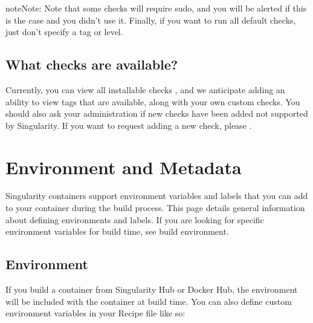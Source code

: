 \documentclass[letterpaper,10pt,english]{sphinxmanual}
\begin{document}
\begin{sphinxadmonition}{note}{Note:}
Note that some checks will require sudo, and you will be alerted if this
is the case and you didn’t use it. Finally, if you want to run all
default checks, just don’t specify a tag or level.
\end{sphinxadmonition}


\section{What checks are available?}
\label{\detokenize{container_checks:what-checks-are-available}}
Currently, you can view all installable checks
,
and we anticipate adding an ability to view tags that are available,
along with your own custom checks. You should also ask your
administration if new checks have been added not supported by
Singularity. If you want to request adding a new check, please .


\chapter{Environment and Metadata}
\label{\detokenize{environment_and_metadata:environment-and-metadata}}\label{\detokenize{environment_and_metadata::doc}}\label{\detokenize{environment_and_metadata:sec-envandmetadata}}
Singularity containers support environment variables and labels that you
can add to your container during the build process. This page details
general information about defining environments and labels. If you are
looking for specific environment variables for build time, see build
environment.


\section{Environment}
\label{\detokenize{environment_and_metadata:environment}}
If you build a container from Singularity Hub or Docker Hub, the
environment will be included with the container at build time. You can
also define custom environment variables in your Recipe file like so:

%
\begin{sphinxVerbatim}[commandchars=\\\{\}]
 

 




     
\end{sphinxVerbatim}
\end{document}
